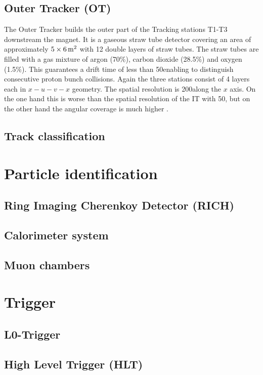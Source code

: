\subsection{Outer Tracker (OT)}
The Outer Tracker builds the outer part of the Tracking stations T1-T3 downstream the magnet.
It is a gaseous straw tube detector covering an area of approximately $5 \times 6 {\rm \,m}^2$ with 12 double layers of straw tubes.
The straw tubes are filled with a gas mixture of argon (70\%), carbon dioxide (28.5\%) and oxygen (1.5\%).
This guarantees a drift time of less than 50\ns enabling to distinguish consecutive proton bunch collisions.
Again the three stations consist of 4 layers each in $x-u-v-x$ geometry.
The spatial resolution is 200\mum along the $x$ axis.
On the one hand this is worse than the spatial resolution of the IT with 50\mum, but on the other hand the angular coverage is much higher \cite{OT_Performance}.

\subsection{Track classification}


\section{Particle identification}

\subsection{Ring Imaging Cherenkoy Detector (RICH)}

\subsection{Calorimeter system}

\subsection{Muon chambers}

\section{Trigger}

\subsection{L0-Trigger}

\subsection{High Level Trigger (HLT)}
